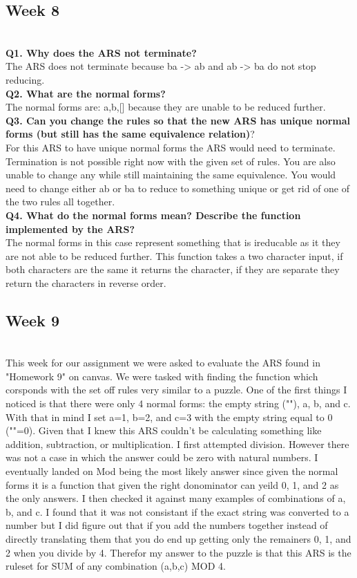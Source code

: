 \documentclass{article}
\theoremstyle{theorem}
\theoremstyle{definition}
\theoremstyle{remark}
\begin{document}
\subsection{Week 8}
\\\textbf{Q1. Why does the ARS not terminate?}
\\The ARS does not terminate because ba -> ab and ab -> ba do not stop reducing.
\\\textbf{Q2. What are the normal forms?} 
\\The normal forms are: a,b,[] because they are unable to be reduced further.
\\\textbf{Q3. Can you change the rules so that the new ARS has unique normal forms (but still has the same equivalence relation)}?
\\For this ARS to have unique normal forms the ARS would need to terminate. Termination is not possible right now with the given set of rules. You are also unable to change any while still maintaining the same equivalence. You would need to change either ab or ba to reduce to something unique or get rid of one of the two rules all together.
\\\textbf{Q4. What do the normal forms mean? Describe the function implemented by the ARS?}
\\The normal forms in this case represent something that is ireducable as it they are not able to be reduced further. This function takes a two character input, if both characters are the same it returns the character, if they are separate they return the characters in reverse order.
\subsection{Week 9}
\\This week for our assignment we were asked to evaluate the ARS found in "Homework 9" on canvas. We were tasked with finding the function which corsponds with the set off
rules very similar to a puzzle. One of the first things I noticed is that there were only 4 normal forms: the empty string (""), a, b, and c. With that in mind I set a=1, b=2, and c=3 with the empty string equal to 0 (""=0). Given that I knew this ARS couldn't be 
calculating something like addition, subtraction, or multiplication. I first attempted division. However there was not a case in which the answer could be zero with natural numbers. 
I eventually landed on Mod being the most likely answer since given the normal forms it is a function that given the right donominator can yeild 0, 1, and 2 as the only answers. I then checked it against many examples of combinations of a, b, and c.
I found that it was not consistant if the exact string was converted to a number but I did figure out that if you add the numbers together instead of directly translating them that you do end up getting only the remainers 0, 1, and 2 when you divide by 4.
Therefor my answer to the puzzle is that this ARS is the ruleset for SUM of any combination (a,b,c) MOD 4.
\end{document}
